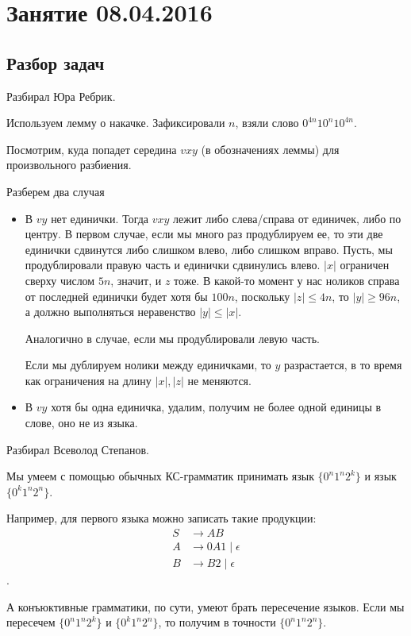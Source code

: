 \chapter{Занятие 08.04.2016}
\section{Разбор задач}

Разбирал Юра Ребрик.

Используем лемму о накачке. Зафиксировали $n$, взяли слово $0^{4n}10^n10^{4n}$.

Посмотрим, куда попадет середина $vxy$ (в обозначениях леммы) для произвольного разбиения.

Разберем два случая
\begin{itemize}
\item
В $vy$ нет единички.
Тогда $vxy$ лежит либо слева/справа от единичек, либо по центру.
В первом случае, если мы много раз продублируем ее, то эти две единички сдвинутся либо слишком влево, либо слишком вправо.
Пусть, мы продублировали правую часть и единички сдвинулись влево. $|x|$ ограничен сверху числом $5n$, значит, и $z$ тоже. 
В какой-то момент у нас ноликов справа от последней единички будет хотя бы $100n$, поскольку $|z| \leq 4n$, то $|y| \geq 96n$, а должно выполняться неравенство $|y| \leq |x|$.

Аналогично в случае, если мы продублировали левую часть.

Если мы дублируем нолики между единичками, то $y$ разрастается, в то время как ограничения на длину $|x|, |z|$ не меняются.

\item
В $vy$ хотя бы одна единичка, удалим, получим не более одной единицы в слове, оно не из языка.
\end{itemize}

Разбирал Всеволод Степанов.

Мы умеем с помощью обычных КС-грамматик принимать язык $\{0^n1^n2^k\}$ и язык $\{0^k1^n2^n\}$.

Например, для первого языка можно записать такие продукции: 
\begin{align*}
S &\to AB \\
A &\to 0A1 \mid \epsilon \\ 
B &\to B2 \mid \epsilon
\end{align*}.

А конъюктивные грамматики, по сути, умеют брать пересечение языков. Если мы пересечем $\{0^n1^n2^k\}$ и $\{0^k1^n2^n\}$, то получим в точности $\{0^n1^n2^n\}$.

